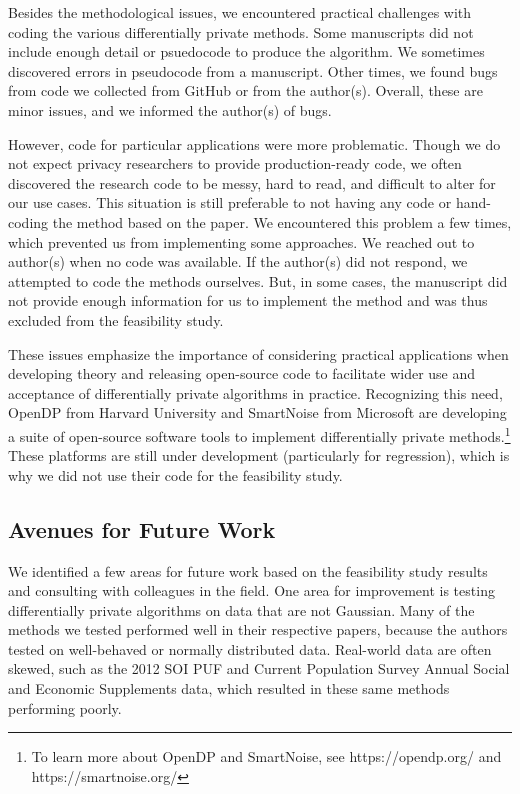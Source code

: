 Besides the methodological issues, we encountered practical challenges with coding the various differentially private methods. Some manuscripts did not include enough detail or psuedocode to produce the algorithm. We sometimes discovered errors in pseudocode from a manuscript. Other times, we found bugs from code we collected from GitHub or from the author(s). Overall, these are minor issues, and we informed the author(s) of bugs.

However, code for particular applications were more problematic. Though we do not expect privacy researchers to provide production-ready code, we often discovered the research code to be messy, hard to read, and difficult to alter for our use cases. This situation is still preferable to not having any code or hand-coding the method based on the paper. We encountered this problem a few times, which prevented us from implementing some approaches. We reached out to author(s) when no code was available. If the author(s) did not respond, we attempted to code the methods ourselves. But, in some cases, the manuscript did not provide enough information for us to implement the method and was thus excluded from the feasibility study.

These issues emphasize the importance of considering practical applications when developing theory and releasing open-source code to facilitate wider use and acceptance of differentially private algorithms in practice. Recognizing this need, OpenDP from Harvard University and SmartNoise from Microsoft are developing a suite of open-source software tools to implement differentially private methods.\footnote{To learn more about OpenDP and SmartNoise, see https://opendp.org/ and https://smartnoise.org/} These platforms are still under development (particularly for regression), which is why we did not use their code for the feasibility study.

\subsection{Avenues for Future Work}\label{subsec:future}
We identified a few areas for future work based on the feasibility study results and consulting with colleagues in the field. One area for improvement is testing differentially private algorithms on data that are not Gaussian. Many of the methods we tested performed well in their respective papers, because the authors tested on well-behaved or normally distributed data. Real-world data are often skewed, such as the 2012 SOI PUF and Current Population Survey Annual Social and Economic Supplements data, which resulted in these same methods performing poorly.

